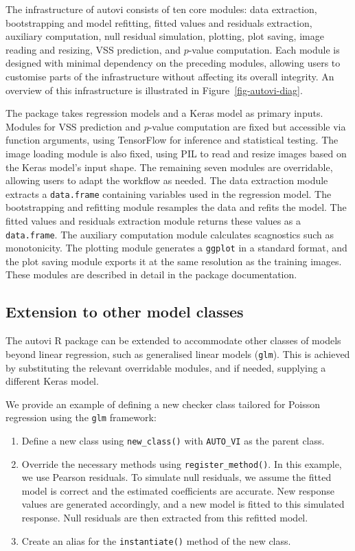 \documentclass[
doublespace,
  times]{anzsauth}
\providecommand{\tightlist}{%
  \setlength{\itemsep}{0pt}\setlength{\parskip}{0pt}}\usepackage{longtable,booktabs,array}
\begin{document}
The infrastructure of \textsf{autovi} consists of ten core modules: data
extraction, bootstrapping and model refitting, fitted values and
residuals extraction, auxiliary computation, null residual simulation,
plotting, plot saving, image reading and resizing, VSS prediction, and
\(p\)-value computation. Each module is designed with minimal dependency
on the preceding modules, allowing users to customise parts of the
infrastructure without affecting its overall integrity. An overview of
this infrastructure is illustrated in Figure~\ref{fig-autovi-diag}.

The package takes regression models and a \textsf{Keras} model as
primary inputs. Modules for VSS prediction and \(p\)-value computation
are fixed but accessible via function arguments, using
\textsf{TensorFlow} for inference and statistical testing. The image
loading module is also fixed, using \textsf{PIL} to read and resize
images based on the \textsf{Keras} model's input shape. The remaining
seven modules are overridable, allowing users to adapt the workflow as
needed. The data extraction module extracts a \texttt{data.frame}
containing variables used in the regression model. The bootstrapping and
refitting module resamples the data and refits the model. The fitted
values and residuals extraction module returns these values as a
\texttt{data.frame}. The auxiliary computation module calculates
scagnostics such as monotonicity. The plotting module generates a
\texttt{ggplot} in a standard format, and the plot saving module exports
it at the same resolution as the training images. These modules are
described in detail in the package documentation.

\subsection{Extension to other model
classes}\label{extension-to-other-model-classes}

The \textsf{autovi} \textsf{R} package can be extended to accommodate
other classes of models beyond linear regression, such as generalised
linear models (\texttt{glm}). This is achieved by substituting the
relevant overridable modules, and if needed, supplying a different
\textsf{Keras} model.

We provide an example of defining a new checker class tailored for
Poisson regression using the \texttt{glm} framework:

\begin{enumerate}
\def\labelenumi{\arabic{enumi}.}
\tightlist
\item
  Define a new class using \texttt{new\_class()} with \texttt{AUTO\_VI}
  as the parent class.
\item
  Override the necessary methods using \texttt{register\_method()}. In
  this example, we use Pearson residuals. To simulate null residuals, we
  assume the fitted model is correct and the estimated coefficients are
  accurate. New response values are generated accordingly, and a new
  model is fitted to this simulated response. Null residuals are then
  extracted from this refitted model.
\item
  Create an alias for the \texttt{instantiate()} method of the new
  class.
\end{enumerate}
\end{document}
